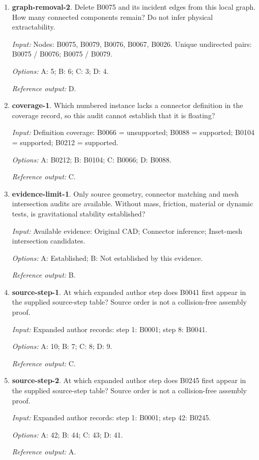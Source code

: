 \begin{enumerate}
\item \textbf{graph-removal-2}. Delete B0075 and its incident edges from this local graph. How many connected components remain? Do not infer physical extractability.\par {\small \textit{Input:} Nodes: B0075, B0079, B0076, B0067, B0026. Unique undirected pairs: B0075 / B0076; B0075 / B0079. \par\textit{Options:} A: 5; B: 6; C: 3; D: 4. \par\textit{Reference output:} D.}
\item \textbf{coverage-1}. Which numbered instance lacks a connector definition in the coverage record, so this audit cannot establish that it is floating?\par {\small \textit{Input:} Definition coverage: B0066 = unsupported; B0088 = supported; B0104 = supported; B0212 = supported. \par\textit{Options:} A: B0212; B: B0104; C: B0066; D: B0088. \par\textit{Reference output:} C.}
\item \textbf{evidence-limit-1}. Only source geometry, connector matching and mesh intersection audits are available. Without mass, friction, material or dynamic tests, is gravitational stability established?\par {\small \textit{Input:} Available evidence: Original CAD; Connector inference; Inset-mesh intersection candidates. \par\textit{Options:} A: Established; B: Not established by this evidence. \par\textit{Reference output:} B.}
\item \textbf{source-step-1}. At which expanded author step does B0041 first appear in the supplied source-step table? Source order is not a collision-free assembly proof.\par {\small \textit{Input:} Expanded author records: step 1: B0001; step 8: B0041. \par\textit{Options:} A: 10; B: 7; C: 8; D: 9. \par\textit{Reference output:} C.}
\item \textbf{source-step-2}. At which expanded author step does B0245 first appear in the supplied source-step table? Source order is not a collision-free assembly proof.\par {\small \textit{Input:} Expanded author records: step 1: B0001; step 42: B0245. \par\textit{Options:} A: 42; B: 44; C: 43; D: 41. \par\textit{Reference output:} A.}

\end{enumerate}
